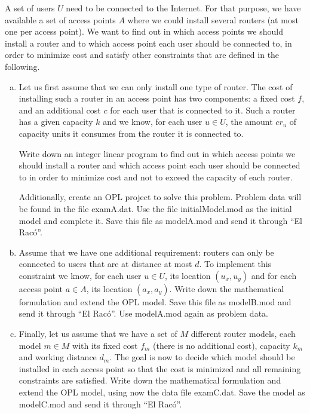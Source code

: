 \documentclass[11pt, oneside]{article}   	%
\begin{document}
A set of users $U$ need to be connected to the Internet. For that purpose, we have available a set of access points $A$ where we could install several routers (at most one per access point). We want to find out in which access points we should install a router and to which access point each user should be connected to, in order to minimize cost and satisfy other constraints that are defined in the following.

\begin{enumerate}[(a)]
\item Let us first assume that we can only install one type of router. The cost of installing such a router in an access point has two components: a fixed cost $f$, and an additional cost $c$ for each user that is connected to it. Such a router has a given capacity $k$ and we know, for each user $u \in U$, the amount $cr_u$ of capacity units it consumes from the router it is connected to.

Write down an integer linear program to find out in which access points we should install a router and which access point each user should be connected to in order to minimize cost and not to exceed the capacity of each router.

Additionally, create an OPL project to solve this problem. Problem data will be found in the file examA.dat. Use the file initialModel.mod as the initial model and complete it. Save this file as modelA.mod and send it through “El Racó”.
\item Assume that we have one additional requirement: routers can only be connected to users that are at distance at most $d$. To implement this constraint we know, for each user $u \in U$, its location $(u_x,u_y)$ and for each access point $a \in A$, its location $(a_x,a_y)$. Write down the mathematical formulation and extend the OPL model. Save this file as modelB.mod and send it through “El Racó”. Use modelA.mod again as problem data.
\item Finally, let us assume that we have a set of $M$ different router models, each model $m \in M$ with its fixed cost $f_m$ (there is no additional cost), capacity $k_m$ and working distance $d_m$. The goal is now to decide which model should be installed in each access point so that the cost is minimized and all remaining constraints are satisfied. Write down the mathematical formulation and extend the OPL model, using now the data file examC.dat. Save the model as modelC.mod and send it through “El Racó”.
\end{enumerate}
\end{document}
